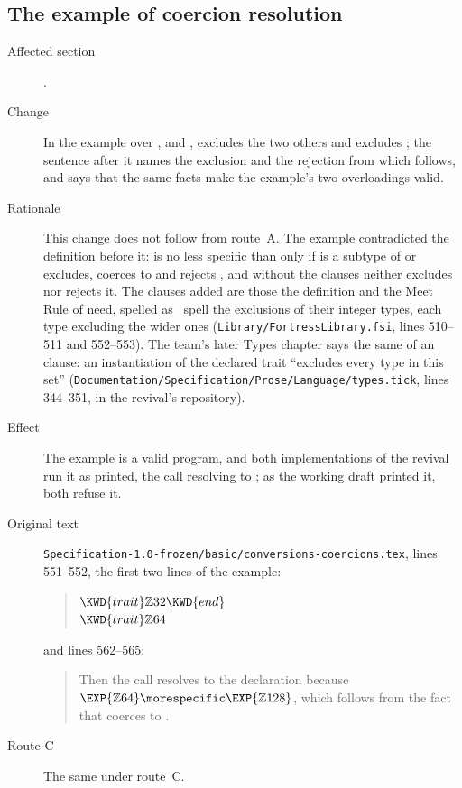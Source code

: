 \subsection{The example of coercion resolution}

\begin{description}
\item[Affected section] .
\item[Change] In the example over ,  and
,  excludes the two others and 
excludes ; the sentence after it names the exclusion and the
rejection from which  follows, and
says that the same facts make the example's two overloadings valid.
\item[Rationale] This change does not follow from route~A. The example contradicted
the definition before it:  is no less specific than  only if  is
a subtype of  or excludes, coerces to and rejects , and without the
clauses  neither excludes  nor rejects it.
The clauses added are those the definition and the Meet Rule of
 need, spelled as \library\ spell the exclusions of
their integer types, each type excluding the wider ones
(\nolinkurl{Library/FortressLibrary.fsi}, lines 510--511 and 552--553).
The team's later Types chapter says the same of an  clause: an
instantiation of the declared trait ``excludes every type in this set''
(\nolinkurl{Documentation/Specification/Prose/Language/types.tick}, lines 344--351,
in the revival's repository).
\item[Effect] The example is a valid program, and both implementations of the revival
run it as printed, the call resolving to ; as the working draft
printed it, both refuse it.
\item[Original text] \nolinkurl{Specification-1.0-frozen/basic/conversions-coercions.tex},
lines 551--552, the first two lines of the example:
\begin{quote}
\begin{Fortress}
\(\KWD{trait} \mathbb{Z}32 \KWD{end}\)\\
\(\KWD{trait} \mathbb{Z}64\)
\end{Fortress}
\end{quote}
and lines 562--565:
\begin{quote}
Then the call  resolves to the
declaration  because $\EXP{\mathbb{Z}64}
\morespecific \EXP{\mathbb{Z}128}$, which follows from the fact that
 coerces to .
\end{quote}
\item[Route C] The same under route~C.
\end{description}

